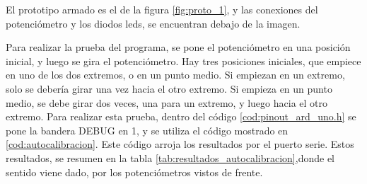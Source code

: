 El prototipo armado es el de la figura \ref{fig:proto_1}, y las conexiones del potenciómetro y los diodos leds, se encuentran debajo de la imagen.  
%

Para realizar la prueba del programa, se pone el potenciómetro en una posición inicial, y luego se gira el potenciómetro. Hay tres posiciones iniciales, que empiece en uno de los dos extremos, o en un punto medio. Si empiezan en un extremo, solo se debería girar una vez hacia el otro extremo. Si empieza en un punto medio, se debe girar dos veces, una para un extremo, y luego hacia el otro extremo. Para realizar esta prueba, dentro del código \ref{cod:pinout_ard_uno.h} se pone la bandera DEBUG en 1, y se utiliza el código mostrado en \ref{cod:autocalibracion}. Este código arroja los resultados por el puerto serie. Estos resultados, se resumen en la tabla \ref{tab:resultados_autocalibracion},donde el sentido viene dado, por los potenciómetros vistos de frente.   

